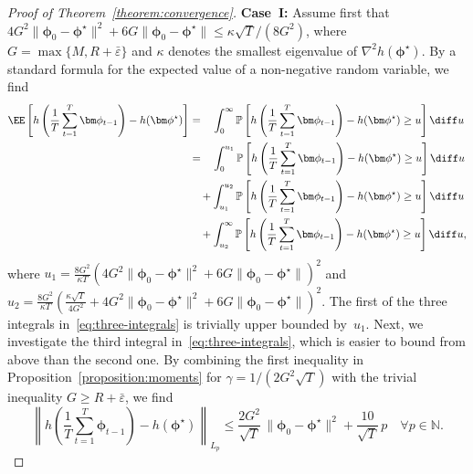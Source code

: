 \documentclass[11pt, a4paper, oneside, reqno]{article}
\begin{document}
\begin{proof} [Proof of Theorem~\ref{theorem:convergence}]
		\textbf{Case~I:} Assume first that $4 G^2 \| \bm \phi_0 - \bm \phi^\star \|^2 + 6 G \| \bm \phi_0 - \bm \phi^\star \| \leq {\kappa \sqrt{T}}/{(8 G^2)}$, where~$G = \max \{M, R + \bar \varepsilon \}$ and $\kappa$ denotes the smallest eigenvalue of $\nabla^2 h(\bm \phi^\star)$. By a standard formula for the expected value of a non-negative random variable, we find
		\begin{align}
		    \EE \left[ h \left(\frac{1}{T} \sum_{t=1}^{T} \bm \phi_{t-1} \right) - h(\bm \phi^\star) \right] \nonumber
		    &= \phantom{+} \int_{0}^\infty \mathbb P \left[ h \left(\frac{1}{T} \sum_{t=1}^{T} \bm \phi_{t-1} \right) - h(\bm \phi^\star) \geq u \right] \diff u \\
		    &= \phantom{+} \int_{0}^{u_1} \mathbb P \left[ h \left(\frac{1}{T} \sum_{t=1}^{T} \bm \phi_{t-1} \right) - h(\bm \phi^\star) \geq u \right] \diff u \nonumber\\
		    &\quad + \int_{u_1}^{u_2} \mathbb P \left[ h \left(\frac{1}{T} \sum_{t=1}^{T} \bm \phi_{t-1} \right) - h(\bm \phi^\star) \geq u \right] \diff u \label{eq:three-integrals}\\
		    &\quad + \int_{u_2}^{\infty} \mathbb P \left[ h \left(\frac{1}{T} \sum_{t=1}^{T} \bm \phi_{t-1} \right) - h(\bm \phi^\star) \geq u \right] \diff u, \nonumber
		\end{align}
		where $u_1 = \frac{8 G^2}{\kappa T}(4 G^2 \| \bm \phi_0 - \bm \phi^\star \|^2 + 6 G \| \bm \phi_0 - \bm \phi^\star \|)^2$ and $u_2 = \frac{8 G^2}{\kappa T}(\frac{\kappa \sqrt{T}}{4 G^2} + 4 G^2 \| \bm \phi_0 - \bm \phi^\star \|^2 + 6 G \| \bm \phi_0 - \bm \phi^\star \|)^2$.
		The first of the three integrals in~\eqref{eq:three-integrals} is trivially upper bounded by~$u_1$.
		Next, we investigate the third integral in~\eqref{eq:three-integrals}, which is easier to bound from above than the second one. By combining the first inequality in Proposition~\ref{proposition:moments} for $\gamma = 1 / (2 G^2 \sqrt{T})$ with the trivial inequality $G \geq R + \bar \varepsilon$, we find
		\[
		    \left\| h\left(\frac{1}{T} \sum_{t=1}^{T} \bm \phi_{t-1} \right) - h(\bm \phi^\star) \right\|_{L_p} \leq \frac{2G^2}{\sqrt{T}}\,\|\bm \phi_0-\bm \phi^\star\|^2 + \frac{10}{\sqrt{T}} \,p\quad \forall p\in\mathbb N.
\]
\end{proof}
\end{document}
